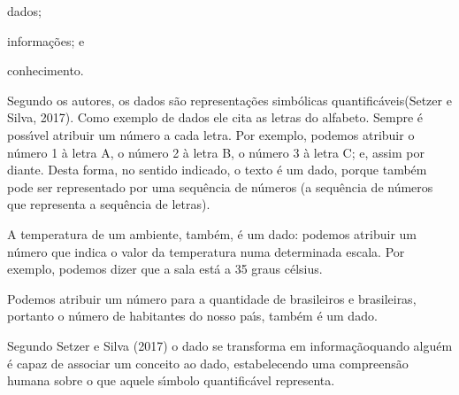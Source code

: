 \documentclass[
12pt,		%
openright,	%
twoside,  %
a4paper,			%
chapter=TITLE,		%
english,			%
french,				%
spanish,			%
brazil				%
]{USPSC-classe/USPSC}
\begin{document}
\begin{alineas}
\item dados;
\item informa\c{c}\~oes; e
\item conhecimento.
\end{alineas}

Segundo os autores, os \textquotedbl  dados \textquotedbl  s\~ao \textquotedbl representa\c{c}\~oes simb\'olicas quantific\'aveis\textquotedbl   (Setzer e Silva, 2017). Como exemplo de dados ele cita as letras do alfabeto. Sempre \'e poss\'{\i}vel atribuir um n\'umero a cada letra. Por exemplo, podemos atribuir o n\'umero 1 \`a letra A, o n\'umero 2 \`a letra B, o n\'umero 3 \`a letra C; e, assim por diante. Desta forma, no sentido indicado, o texto \'e um dado, porque tamb\'em pode ser representado por uma sequ\^encia de n\'umeros (a sequ\^encia de n\'umeros que representa a sequ\^encia de letras).

















A temperatura de um ambiente, tamb\'em, \'e um dado: podemos atribuir um n\'umero que indica o valor da temperatura numa determinada escala. Por exemplo, podemos dizer que a sala \textquotedbl est\'a a 35 graus c\'elsius\textquotedbl .

















Podemos atribuir um n\'umero para a quantidade de brasileiros e brasileiras, portanto o n\'umero de habitantes do nosso pa\'{\i}s, tamb\'em \'e um dado.

















Segundo Setzer e Silva (2017) o dado se transforma em \textquotedbl informa\c{c}\~ao\textquotedbl  quando algu\'em \'e capaz de associar um conceito ao dado, estabelecendo uma compreens\~ao humana sobre o que aquele s\'{\i}mbolo quantific\'avel representa.
\end{document}
